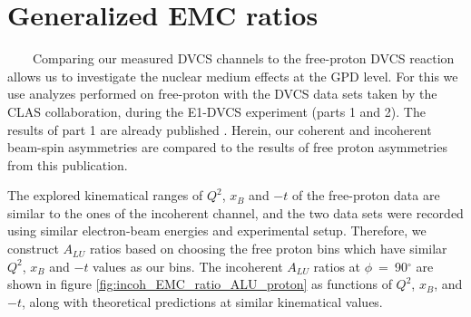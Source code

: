 \section{Generalized EMC ratios}
~~~~Comparing our measured DVCS channels to the free-proton DVCS reaction 
allows us to investigate the nuclear medium effects at the GPD level. For this 
we use analyzes performed on free-proton with the DVCS data sets taken by the CLAS 
collaboration, during the E1-DVCS experiment (parts 1 and 2). The results of 
part 1 are already published \cite{FX_BSA, CLAS_cross_section}. Herein, our 
coherent and incoherent beam-spin asymmetries are compared to the results of
free proton asymmetries from this publication.


The explored kinematical ranges of $Q^2$, $x_{B}$ and $-t$ of the free-proton 
data are similar to the ones of the incoherent channel, and the two data sets 
were recorded using similar electron-beam energies and experimental setup.  
Therefore, we construct $A_{LU}$ ratios based on choosing the free proton bins 
which have similar $Q^2$, $x_{B}$ and $-t$ values as our bins. The incoherent 
$A_{LU}$ ratios at $\phi$~=~90$^{\circ}$ are shown in figure 
\ref{fig:incoh_EMC_ratio_ALU_proton} as functions of $Q^{2}$, $x_{B}$, and 
$-t$, along with theoretical predictions at similar kinematical values.\\
  

